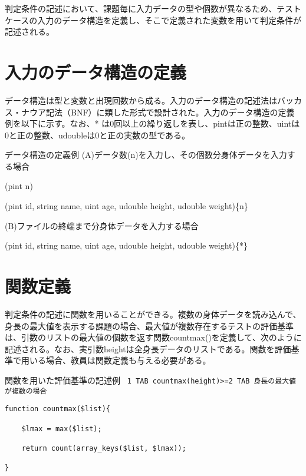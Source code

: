 \documentclass{tpu-sotu}
\begin{document}
判定条件の記述において、課題毎に入力データの型や個数が異なるため、テストケースの入力のデータ構造を定義し、そこで定義された変数を用いて判定条件が記述される。
\section{入力のデータ構造の定義}
データ構造は型と変数と出現回数から成る。入力のデータ構造の記述法はバッカス・ナウア記法（BNF）に類した形式で設計された。入力のデータ構造の定義例を以下に示す。なお、* は0回以上の繰り返しを表し、pintは正の整数、uintは0と正の整数、udoubleは0と正の実数の型である。

\begin{minipage}[b]{1.025\textwidth}
\begin{itembox}[l]{データ構造の定義例}
(A)データ数(n)を入力し、その個数分身体データを入力する場合
{\tt

(pint n)

(pint id, string name, uint age, udouble height, udouble weight)\{n\}
}

(B)ファイルの終端まで分身体データを入力する場合
{\tt

(pint id, string name, uint age, udouble height, udouble weight)\{*\}
}

\end{itembox}
\end{minipage}

\section{関数定義}
判定条件の記述に関数を用いることができる。複数の身体データを読み込んで、身長の最大値を表示する課題の場合、最大値が複数存在するテストの評価基準は、引数のリストの最大値の個数を返す関数countmax()を定義して、次のように記述される。なお、実引数heightは全身長データのリストである。関数を評価基準で用いる場合、教員は関数定義も与える必要がある。

\begin{minipage}[b]{.8\textwidth}
\begin{itembox}[l]{関数を用いた評価基準の記述例}
{\tt
1 TAB countmax(height)>=2 TAB 身長の最大値が複数の場合
}
\end{itembox}
\end{minipage}
\begin{lstlisting}[caption = countmax 関数, basicstyle=\ttfamily\footnotesize, frame=single]
function countmax($list){

	$lmax = max($list);

	return count(array_keys($list, $lmax));

}
\end{lstlisting}
\end{document}
